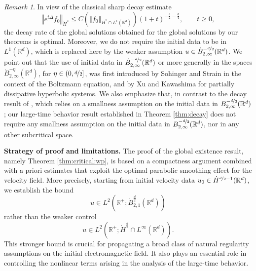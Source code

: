 \documentclass[11pt, leqno, a4paper,]{amsart}
\newcommand{\R}{\mathbb{R}}
\theoremstyle{remark}
\newtheorem{remark}[theorem]{Remark}
\numberwithin{equation}{section}
\newcommand*{\norm}[1]{\left\Vert #1\right\Vert}
\begin{document}
   
   
\begin{remark} In view of the classical sharp decay estimate \cite{BS18,S86}
\begin{equation*}
	\norm {e^{t\Delta} f_0}_{\dot H^{s}} \leq C(\norm {f_0}_{\dot{{H}} ^{s}\cap L^1 (\mathbb{R}^d)}) (1+t)^{- \frac{s}{2} -\frac{d}{4}}, \qquad t\geq 0,
\end{equation*}
 the decay rate of the global solutions obtained for the global solutions by our theorems is optimal. 
 Moreover, we do not require the initial data to be in $L^1(\R^d)$, which is replaced here by the weaker assumption $ u\in  \dot{{B}}_{2,\infty}^{-\nicefrac{d}{2}}(\mathbb{R}^d)$.  We point out that the use of  initial data in $\dot{{B}}_{2,\infty}^{-\nicefrac{d}{2} }(\mathbb{R}^d)$ or more generally in the spaces $\dot{{B}}_{2,\infty}^{-\eta }(\mathbb{R}^d) $, for $\eta \in (0, \nicefrac{d}{2}]$, was first introduced by Sohinger and Strain \cite{Sohinger_Strain_2014} in the context of the Boltzmann equation, and by Xu and Kawashima \cite{Xu_Kawashima_2015} for partially dissipative hyperbolic systems. We also emphasize that, in contrast to the decay result of \cite{Xu_Kawashima_2015}, which relies on a smallness assumption on the initial data in $B^{-\nicefrac{d}{2}}_{2,\infty}(\R^d)$; our large-time behavior result established in Theorem \ref{thm:decay} does not require any smallness assumption on the initial data in   $B^{-\nicefrac{d}{2}}_{2,\infty}(\R^d)$, nor in any other subcritical space. 
\end{remark}

\medskip

\noindent\textbf{Strategy of proof and limitations.}
The proof of the global existence result, namely Theorem \ref{thm:critical:wp}, is based on a compactness  
argument combined with a priori estimates that exploit the optimal parabolic smoothing effect for the velocity field. More precisely, starting from initial velocity data $u_0\in\dot H^{\nicefrac d2-1}(\mathbb R^d)$, we establish the bound
\begin{equation*}
	u \in L^2(\mathbb R^+; \dot B^\frac{d}{2}_{2,1} (\mathbb R^d))
\end{equation*}  rather than the weaker control
\begin{equation*}
	u \in L^2(\mathbb R^+; \dot H^\frac{d}{2}\cap L^\infty (\mathbb R^d)).
\end{equation*} 
This stronger bound is crucial for propagating a broad class of natural regularity assumptions on the initial electromagnetic field. It also plays an essential role in controlling the nonlinear terms arising in the analysis of the large-time behavior.
 
\end{document}
